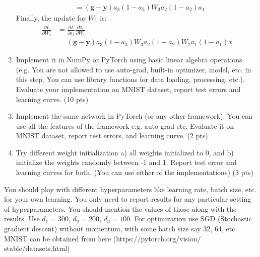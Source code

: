 \documentclass[a4paper]{article}
\theoremstyle{definition}
\newenvironment{soln}{
    \leavevmode\color{blue}\ignorespaces
}{}
\begin{document}
\begin{enumerate}
\begin{soln}
$$\begin{aligned}
            & = (\mathbf{g} - \mathbf{y}) a_3 (1 - a_3) W_3 a_2 (1 - a_2) a_1
        \end{aligned}
        $$
        Finally, the update for $W_1$ is:
        $$
        \begin{aligned}
            \frac{\partial L}{\partial W_1} & = \frac{\partial L}{\partial a_1} \frac{\partial a_1}{\partial W_1} \\
            & = (\mathbf{g} - \mathbf{y}) a_3 (1 - a_3) W_3 a_2 (1 - a_2) W_2 a_1 (1 - a_1) x
        \end{aligned}
        $$
    \end{soln}

    \item Implement it in NumPy or PyTorch using basic linear algebra operations. (e.g. You are not allowed to use auto-grad, built-in optimizer, model, etc. in this step. You can use library functions for data loading, processing, etc.). Evaluate your implementation on MNIST dataset, report test errors and learning curve. (10 pts)
    \item Implement the same network in PyTorch (or any other framework). You can use all the features of the framework e.g. auto-grad etc. Evaluate it on MNIST dataset, report test errors, and learning curve. (2 pts)
    \item Try different weight initialization a) all weights initialized to 0, and b) initialize the weights randomly between -1 and 1. Report test error and learning curves for both. (You can use either of the implementations) (3 pts)
\end{enumerate}

You should play with different hyperparameters like learning rate, batch size, etc. for your own learning. You only need to report results for any particular setting of hyperparameters. You should mention the values of those along with the results. Use $d_1 = 300$, $d_2 = 200$, $d_3 = 100$. For optimization use SGD (Stochastic gradient descent) without momentum, with some batch size say 32, 64, etc. MNIST can be obtained from here (https://pytorch.org/vision/ stable/datasets.html)


\end{document}
